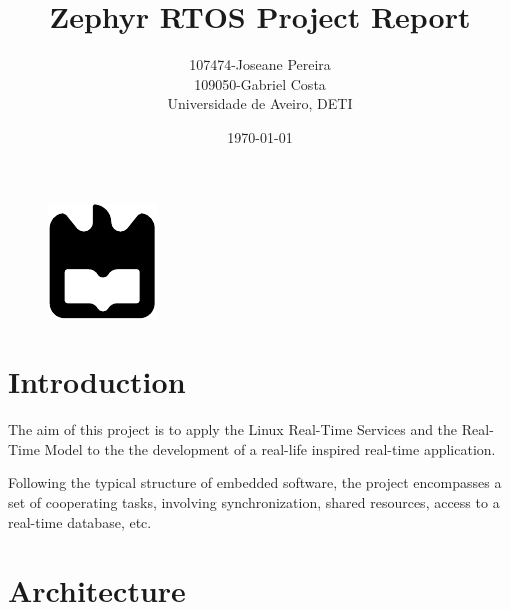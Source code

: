 \documentclass[a4paper,12pt]{article}
\title{Zephyr RTOS Project Report}
\author{
107474-Joseane Pereira \\
109050-Gabriel Costa \\
Universidade de Aveiro, DETI
}
\date{\today}
\begin{document}
\begin{figure}
    \centering
    \includegraphics[width=0.3\linewidth]{ua.pdf}
    \label{fig:enter-label}
\end{figure}
\maketitle
\newpage
\tableofcontents
\newpage

\section{Introduction}
The aim of this project is to apply the Linux Real-Time Services and the Real-Time Model to the
the development of a real-life inspired real-time application.

Following the typical structure of embedded software, the project encompasses a set of cooperating
tasks, involving synchronization, shared resources, access to a real-time database, etc.

\section{Architecture}
\end{document}
